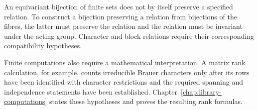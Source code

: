 An equivariant bijection of finite sets does not by itself preserve a
specified relation. To construct a bijection preserving a relation from
bijections of the fibres, the latter must preserve the relation and the
relation must be invariant under the acting group. Character and block
relations require their corresponding compatibility hypotheses.

Finite computations also require a mathematical interpretation. A matrix
rank calculation, for example, counts irreducible Brauer characters only
after its rows have been identified with character restrictions and the
required spanning and independence statements have been established.
Chapter~\ref{chap:library-computations} states these hypotheses and proves
the resulting rank formulas.
